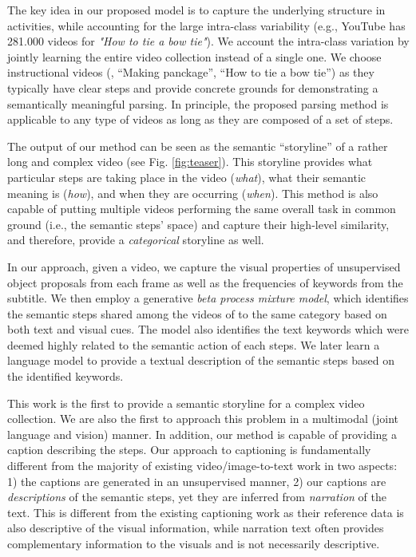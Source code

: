 The key idea in our proposed model is to capture the underlying structure in activities, while accounting for the large intra-class variability (e.g., YouTube has 281.000 videos for \emph{"How to tie a bow tie"}). We account the intra-class variation by jointly learning the entire video collection instead of a single one. We choose instructional videos (\eg, ``Making panckage'', ``How to tie a bow tie'') as they typically have clear steps and provide concrete grounds for demonstrating a semantically meaningful parsing. In principle, the proposed parsing method is applicable to any type of videos as long as they are composed of a set of steps.

The output of our method can be seen as the semantic ``storyline'' of a rather long and complex video (see Fig. \ref{fig:teaser}). This storyline provides what particular steps are taking place in the video (\emph{what}), what their semantic meaning is (\emph{how}), and when they are occurring (\emph{when}). This method is also capable of putting multiple videos performing the same overall task in common ground (i.e., the semantic steps’ space) and capture their high-level similarity, and therefore, provide a \emph{categorical} storyline as well.

In our approach, given a video, we capture the visual properties of unsupervised object proposals from each frame as well as the frequencies of keywords from the subtitle. We then employ a generative \emph{beta process mixture model}, which identifies the semantic steps shared among the videos of to the same category based on both text and visual cues. The model also identifies the text keywords which were deemed highly related to the semantic action of each steps. We later learn a language model to provide a textual description of the semantic steps based on the identified keywords.

This work is the first to provide a semantic storyline for a complex video collection. We are also the first to approach this problem in a multimodal (joint language and vision) manner. In addition, our method is capable of providing a caption describing the steps. Our approach to captioning is fundamentally different from the majority of existing video/image-to-text work in two aspects: 1) the captions are generated in an unsupervised manner, 2) our captions are \emph{descriptions} of the semantic steps, yet they are inferred from \emph{narration} of the text. This is different from the existing captioning work as their reference data is also descriptive of the visual information, while narration text often provides complementary information to the visuals and is not necessarily descriptive.

